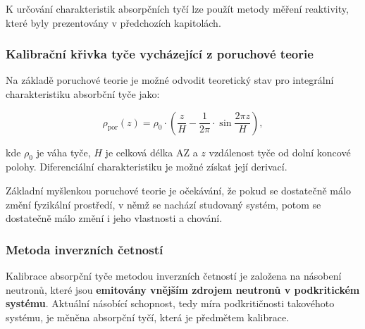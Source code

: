 K určování charakteristik absorpčních tyčí lze použít metody měření reaktivity, které byly prezentovány v předchozích kapitolách. 


\subsubsection{Kalibrační křivka tyče vycházející z poruchové teorie}

Na základě poruchové teorie je možné odvodit teoretický stav pro integrální charakteristiku absorbční tyče jako:

\begin{equation*}
    \rho_\text{por} (z) = \rho_\text{0} \cdot \left(\frac{z}{H} - \frac{1}{2\pi}\cdot \sin\frac{2\pi z }{H} \right),
\end{equation*}

kde $\rho_\text{0}$ je váha tyče, $H$ je celková délka AZ a $z$ vzdálenost tyče od dolní koncové polohy. Diferenciální charakteristiku je možné získat její derivací.

Základní myšlenkou poruchové teorie je očekávání, že pokud se dostatečně málo změní fyzikální prostředí, v němž se nachází studovaný systém, potom se dostatečně málo změní i jeho vlastnosti a chování.

\subsubsection{Metoda inverzních četností}

Kalibrace absorpční tyče metodou inverzních četností je založena na násobení neutronů, které jsou \textbf{emitovány vnějším zdrojem neutronů v podkritickém systému}. Aktuální násobící schopnost, tedy míra podkritičnosti takovéhoto systému, je měněna absorpční tyčí, která je předmětem kalibrace. %

